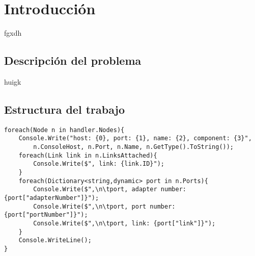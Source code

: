 \chapter{Introducción}\label{chap:Plan}

fgxdh

\section{Descripción del problema}

huigk

\section{Estructura del trabajo}

\begin{lstlisting}[style=CodigoCs]
foreach(Node n in handler.Nodes){
	Console.Write("host: {0}, port: {1}, name: {2}, component: {3}",
		n.ConsoleHost, n.Port, n.Name, n.GetType().ToString());
	foreach(Link link in n.LinksAttached){
		Console.Write($", link: {link.ID}");
	}
	foreach(Dictionary<string,dynamic> port in n.Ports){
		Console.Write($",\n\tport, adapter number: {port["adapterNumber"]}");
		Console.Write($",\n\tport, port number: {port["portNumber"]}");
		Console.Write($",\n\tport, link: {port["link"]}");
	}
	Console.WriteLine();
}
\end{lstlisting}



